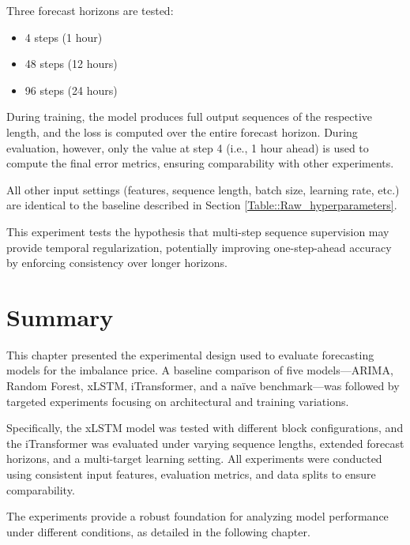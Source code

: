 \documentclass[class=scrbook, crop=false]{standalone}
\begin{document}
Three forecast horizons are tested:
\begin{itemize}
\item 4 steps (1 hour)
\item 48 steps (12 hours)
\item 96 steps (24 hours)
\end{itemize}

During training, the model produces full output sequences of the respective length, and the loss is computed over the entire forecast horizon. During evaluation, however, only the value at step 4 (i.e., 1 hour ahead) is used to compute the final error metrics, ensuring comparability with other experiments.

All other input settings (features, sequence length, batch size, learning rate, etc.) are identical to the baseline described in Section \ref{Table::Raw_hyperparameters}.

This experiment tests the hypothesis that multi-step sequence supervision may provide temporal regularization, potentially improving one-step-ahead accuracy by enforcing consistency over longer horizons.

\section{Summary}
This chapter presented the experimental design used to evaluate forecasting models for the imbalance price. A baseline comparison of five models—ARIMA, Random Forest, xLSTM, iTransformer, and a naïve benchmark—was followed by targeted experiments focusing on architectural and training variations.

Specifically, the xLSTM model was tested with different block configurations, and the iTransformer was evaluated under varying sequence lengths, extended forecast horizons, and a multi-target learning setting. All experiments were conducted using consistent input features, evaluation metrics, and data splits to ensure comparability.

The experiments provide a robust foundation for analyzing model performance under different conditions, as detailed in the following chapter.
\end{document}
